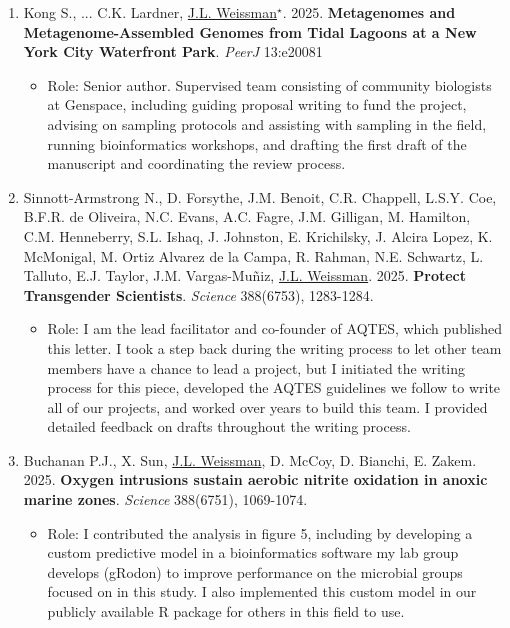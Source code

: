 \documentclass[]{res}
\begin{document}
\begin{resume}
\begin{enumerate}[leftmargin=*]
\item Kong S., ... C.K. Lardner, \underline{J.L. Weissman$^\star$}. 2025. {\bf Metagenomes and Metagenome-Assembled Genomes from Tidal Lagoons at a New York City Waterfront Park}. \emph{PeerJ} 13:e20081

 \begin{itemize}
 	\item Role: Senior author. Supervised team consisting of community biologists at Genspace, including guiding proposal writing to fund the project, advising on sampling protocols and assisting with sampling in the field, running bioinformatics workshops, and drafting the first draft of the manuscript and coordinating the review process.
 \end{itemize}
 
\item Sinnott-Armstrong N., D. Forsythe, J.M. Benoit, C.R. Chappell, L.S.Y. Coe, B.F.R. de Oliveira, N.C. Evans, A.C. Fagre, J.M. Gilligan, M. Hamilton, C.M. Henneberry, S.L. Ishaq, J. Johnston, E. Krichilsky, J. Alcira Lopez, K. McMonigal, M. Ortiz Alvarez de la Campa, R. Rahman, N.E. Schwartz, L. Talluto, E.J. Taylor, J.M. Vargas-Muñiz, \underline{J.L. Weissman}. 2025. {\bf Protect Transgender Scientists}. \emph{Science}  388(6753), 1283-1284.

 \begin{itemize}
 	\item Role: I am the lead facilitator and co-founder of AQTES, which published this letter. I took a step back during the writing process to let other team members have a chance to lead a project, but I initiated the writing process for this piece, developed the AQTES guidelines we follow to write all of our projects, and worked over years to build this team. I provided detailed feedback on drafts throughout the writing process.
  \end{itemize}
 
\item Buchanan P.J., X. Sun, \underline{J.L. Weissman}, D. McCoy, D. Bianchi, E. Zakem. 2025. {\bf Oxygen intrusions sustain aerobic nitrite 
oxidation in anoxic marine zones}. \emph{Science} 388(6751), 1069-1074.
 
 \begin{itemize}
 	\item Role: I contributed the analysis in figure 5, including by developing a custom predictive model in a bioinformatics software my lab group develops (gRodon) to improve performance on the microbial groups focused on in this study. I also implemented this custom model in our publicly available R package for others in this field to use. 
  \end{itemize}
 

\end{enumerate}
\end{resume}
\end{document}

